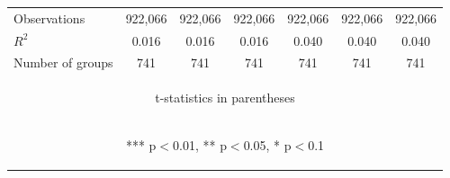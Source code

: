 \documentclass[]{article}
\begin{document}
\begin{center}
\begin{tabular}{lcccccc}
        Observations     & 922,066                                        & 922,066                                        & 922,066                                        & 922,066                                         & 922,066                                        & 922,066                                        \\
        $R^2$            & 0.016                                          & 0.016                                          & 0.016                                          & 0.040                                           & 0.040                                          & 0.040                                          \\
        Number of groups & 741                                            & 741                                            & 741                                            & 741                                             & 741                                            & 741                                            \\ \hline
        \multicolumn{7}{c}{\begin{footnotesize} t-statistics in parentheses\end{footnotesize}}                                                                                                                                                                                                                                  \\
        \multicolumn{7}{c}{\begin{footnotesize} *** p$<$0.01, ** p$<$0.05, * p$<$0.1\end{footnotesize}}                                                                                                                                                                                                                         \\
    \end{tabular}
\end{center}
\end{document}
